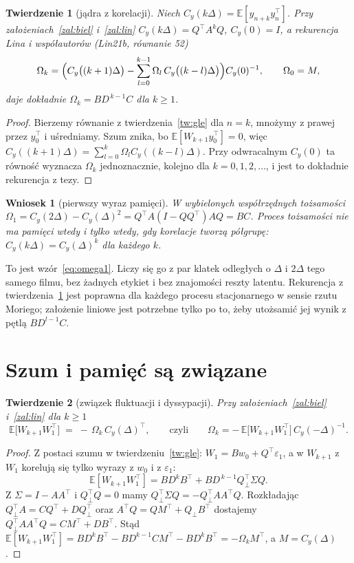 \documentclass[11pt,a4paper]{article}
\newtheorem{twierdzenie}{Twierdzenie}
\newtheorem{wniosek}{Wniosek}
\theoremstyle{definition}
\theoremstyle{remark}
\newcommand{\E}{\mathbb{E}}
\newcommand{\Qp}{Q_{\perp}}
\newcommand{\T}{^{\top}}
\begin{document}
\begin{twierdzenie}[jądra z korelacji]\label{tw:korelacje}
Niech $C_y(k\Delta) = \E[y_{n+k}y_n\T]$. Przy założeniach~\ref{zal:biel} i~\ref{zal:lin}
$C_y(k\Delta) = Q\T A^k Q$, $C_y(0) = I$, a rekurencja Lina i współautorów (Lin21b, równanie 52)
\[
\Omega_k = \Bigl(C_y\bigl((k+1)\Delta\bigr) - \sum_{l=0}^{k-1}\Omega_l\, C_y\bigl((k-l)\Delta\bigr)\Bigr)C_y(0)^{-1},
\qquad \Omega_0 = M,
\]
daje dokładnie $\Omega_k = B D^{\,k-1} C$ dla $k\ge 1$.
\end{twierdzenie}

\begin{proof}
Bierzemy równanie z twierdzenia~\ref{tw:gle} dla $n=k$, mnożymy z prawej przez $y_0\T$ i uśredniamy.
Szum znika, bo $\E[W_{k+1}y_0\T]=0$, więc
$C_y((k+1)\Delta) = \sum_{l=0}^{k}\Omega_l C_y((k-l)\Delta)$. Przy odwracalnym $C_y(0)$ ta równość
wyznacza $\Omega_k$ jednoznacznie, kolejno dla $k = 0,1,2,\dots$, i jest to dokładnie rekurencja z tezy.
\end{proof}

\begin{wniosek}[pierwszy wyraz pamięci]
W wybielonych współrzędnych tożsamości
$\Omega_1 = C_y(2\Delta) - C_y(\Delta)^2 = Q\T A (I - QQ\T) A Q = BC$.
Proces tożsamości nie ma pamięci wtedy i tylko wtedy, gdy korelacje tworzą półgrupę:
$C_y(k\Delta) = C_y(\Delta)^k$ dla każdego $k$.
\end{wniosek}

To jest wzór~\eqref{eq:omega1}. Liczy się go z par klatek odległych o $\Delta$ i $2\Delta$ tego samego
filmu, bez żadnych etykiet i bez znajomości reszty latentu. Rekurencja z twierdzenia~\ref{tw:korelacje}
jest poprawna dla każdego procesu stacjonarnego w sensie rzutu Moriego; założenie liniowe jest potrzebne
tylko po to, żeby utożsamić jej wynik z pętlą $BD^{l-1}C$.

\section{Szum i pamięć są związane}

\begin{twierdzenie}[związek fluktuacji i dyssypacji]\label{tw:fdt}
Przy założeniach~\ref{zal:biel} i~\ref{zal:lin} dla $k\ge 1$
\[
\E\bigl[W_{k+1}W_1\T\bigr] \;=\; -\,\Omega_k\, C_y(\Delta)\T,
\qquad\text{czyli}\qquad
\Omega_k = -\,\E\bigl[W_{k+1}W_1\T\bigr]\,C_y(-\Delta)^{-1}.
\]
\end{twierdzenie}

\begin{proof}
Z postaci szumu w twierdzeniu~\ref{tw:gle}: $W_1 = Bw_0 + Q\T\varepsilon_1$, a w $W_{k+1}$ z $W_1$
korelują się tylko wyrazy z $w_0$ i z $\varepsilon_1$:
\[
\E[W_{k+1}W_1\T] = B D^{k} B\T + B D^{\,k-1}\Qp\T\Sigma Q .
\]
Z $\Sigma = I - AA\T$ i $\Qp\T Q = 0$ mamy $\Qp\T\Sigma Q = -\Qp\T A A\T Q$. Rozkładając
$\Qp\T A = C Q\T + D\Qp\T$ oraz $A\T Q = Q M\T + \Qp B\T$ dostajemy
$\Qp\T AA\T Q = C M\T + D B\T$. Stąd
$\E[W_{k+1}W_1\T] = BD^kB\T - BD^{k-1}CM\T - BD^kB\T = -\Omega_k M\T$, a $M = C_y(\Delta)$.
\end{proof}
\end{document}
